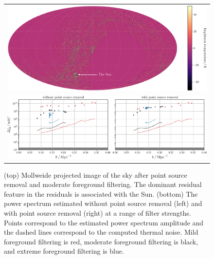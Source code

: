 \documentclass[twocolumn]{aastex62}
\begin{document}
\begin{figure}
    \begin{tabular}{c}
        \includegraphics[width=\textwidth]{filtered-sky-map-colorbar}\\
        \includegraphics[width=\textwidth]{spherical-power-spectrum-filter-strength}\\
    \end{tabular}
    \caption{
        (top) Mollweide projected image of the sky after point source removal and moderate
        foreground filtering. The dominant residual feature in the residuals is associated with the
        Sun.
        (bottom) The power spectrum estimated without point source removal (left) and with point
        source removal (right) at a range of filter strengths. Points correspond to the estimated
        power spectrum amplitude and the dashed lines correspond to the computed thermal noise.
        Mild foreground filtering is red, moderate foreground filtering is black, and extreme
        foreground filtering is blue.
    }
    \label{fig:spherical-power-spectra-filter-strength}
\end{figure}
\end{document}
